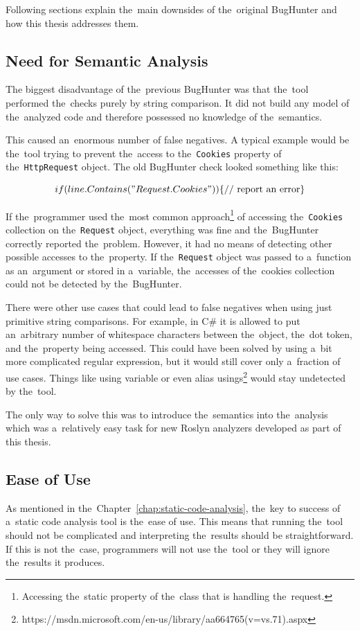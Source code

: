 \documentclass[
  digital, %
  table,   %
  lof,     %
  lot,     %
  oneside,
]{fithesis3}
\begin{document}
Following sections explain the~main downsides of the~original BugHunter and how this thesis addresses them.

\subsection{Need for Semantic Analysis}
The biggest disadvantage of the~previous BugHunter was that the~tool performed the~checks purely by string comparison. It did not build any model of the~analyzed code and therefore possessed no knowledge of the~semantics. 

This caused an~enormous number of false negatives. A typical example would be the~tool trying to prevent the~access to the~\texttt{Cookies} property of the~\texttt{HttpRequest} object. The old BugHunter check looked something like this:

$$
if (line.Contains("Request.Cookies")) \\
\{
  \textnormal{// report an~error}
\}
$$

If the~programmer used the~most common approach\footnote{Accessing the~static property of the~class that is handling the~request.} of accessing the~\texttt{Cookies} collection on the~\texttt{Request} object, everything was fine and the~BugHunter correctly reported the~problem. However, it had no means of detecting other possible accesses to the~property. If the~\texttt{Request} object was passed to a~function as an~argument or stored in a~variable, the~accesses of the~cookies collection could not be detected by the~BugHunter. 

There were other use cases that could lead to false negatives when using just primitive string comparisons. For example, in C\# it is allowed to put an~arbitrary number of whitespace characters between the~object, the~dot token, and the~property being accessed. This could have been solved by using a~bit more complicated regular expression, but it would still cover only a~fraction of use cases. Things like using variable or even alias usings\footnote{https://msdn.microsoft.com/en-us/library/aa664765(v=vs.71).aspx} would stay undetected by the~tool. 

The only way to solve this was to introduce the~semantics into the~analysis which was a~relatively easy task for new Roslyn analyzers developed as part of this thesis.

\subsection{Ease of Use}
As mentioned in the~Chapter~\ref{chap:static-code-analysis}, the~key to success of a~static code analysis tool is the~ease of use. This means that running the~tool should not be complicated and interpreting the~results should be straightforward. If this is not the~case, programmers will not use the~tool or they will ignore the~results it produces. 
\end{document}
